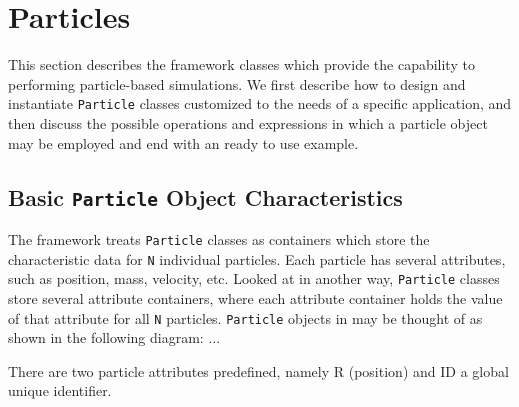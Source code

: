 \chapter{Particles}
\label{sec:particles}
This section describes the \ippl framework classes which provide the capability to performing particle-based simulations. We first describe how to design and instantiate \texttt{Particle} classes customized to the needs of a specific application, and then discuss the possible operations and expressions in which a particle object may be employed and end with an ready to use example.

\section{Basic \texttt{Particle} Object Characteristics}

The \ippl framework treats \texttt{Particle} classes as containers which store the characteristic data for \texttt{N} individual particles. Each particle has several attributes, such as position, mass, velocity, etc. Looked at in another way, \texttt{Particle} classes store several attribute containers, where each attribute container holds the value of that attribute for all \texttt{N} particles. \texttt{Particle} objects in \ippl may be thought of as shown in the following diagram: ...

There are two particle attributes predefined, namely R (position) and ID a global unique identifier.

